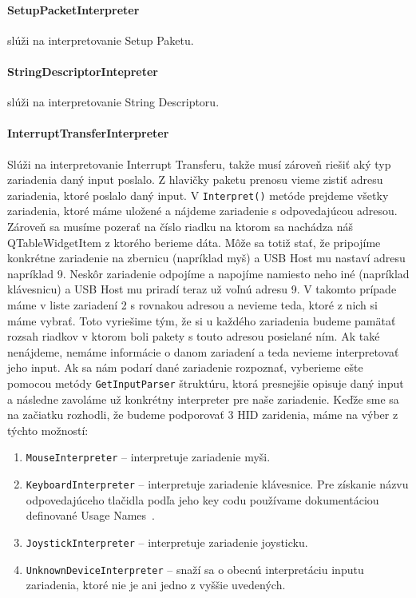 \paragraph{SetupPacketInterpreter} slúži na interpretovanie Setup Paketu.

\paragraph{StringDescriptorIntepreter} slúži na interpretovanie String Descriptoru.

\paragraph{InterruptTransferInterpreter}
\hfill \break
Slúži na interpretovanie Interrupt Transferu, takže musí zároveň riešiť aký typ zariadenia daný input poslalo. Z hlavičky paketu prenosu vieme zistiť adresu zariadenia, ktoré poslalo daný input. V \texttt{Interpret()} metóde prejdeme všetky zariadenia, ktoré máme uložené a nájdeme zariadenie s odpovedajúcou adresou. Zároveň sa musíme pozerať na číslo riadku na ktorom sa nachádza náš QTableWidgetItem z ktorého berieme dáta. Môže sa totiž stať, že pripojíme konkrétne zariadenie na zbernicu (napríklad myš) a USB Host mu nastaví adresu napríklad 9. Neskôr zariadenie odpojíme a napojíme namiesto neho iné (napríklad klávesnicu) a USB Host mu priradí teraz už voľnú adresu 9. V takomto prípade máme v liste zariadení 2 s rovnakou adresou a nevieme teda, ktoré z nich si máme vybrať. Toto vyriešime tým, že si u každého zariadenia budeme pamätať rozsah riadkov v ktorom boli pakety s touto adresou posielané ním. Ak také nenájdeme, nemáme informácie o danom zariadení a teda nevieme interpretovať jeho input. Ak sa nám podarí dané zariadenie rozpoznať, vyberieme ešte pomocou metódy \texttt{GetInputParser} štruktúru, ktorá presnejšie opisuje daný input a následne zavoláme už konkrétny interpreter pre naše zariadenie. Keďže sme sa na začiatku rozhodli, že budeme podporovať 3 HID zaridenia, máme na výber z týchto možností:
\begin{enumerate}
\item \texttt{MouseInterpreter} -- interpretuje zariadenie myši.
\item \texttt{KeyboardInterpreter} -- interpretuje zariadenie klávesnice. Pre získanie názvu odpovedajúceho tlačidla podľa jeho key codu používame dokumentáciou definované Usage Names~\cite{keyboard_keycodes_names}.
\item \texttt{JoystickInterpreter} -- interpretuje zariadenie joysticku.
\item \texttt{UnknownDeviceInterpreter} -- snaží sa o obecnú interpretáciu inputu zariadenia, ktoré nie je ani jedno z vyššie uvedených.
\end{enumerate}

